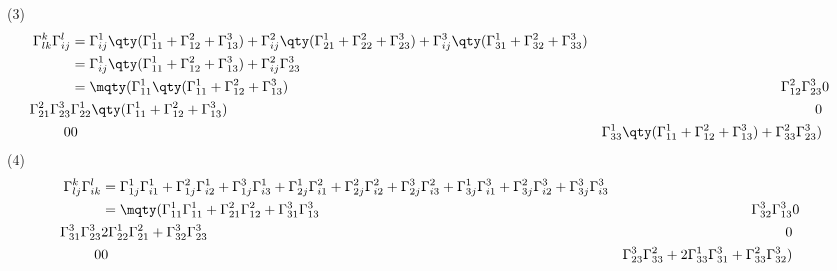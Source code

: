 (3)
\begin{align*}
    \Gamma^k_{lk}\Gamma^l_{ij} &= \Gamma^1_{ij}\qty(\Gamma^1_{11} + \Gamma^2_{12} + \Gamma^3_{13}) + \Gamma^2_{ij}\qty(\Gamma^1_{21} + \Gamma^2_{22} + \Gamma^3_{23}) + \Gamma^3_{ij}\qty(\Gamma^1_{31} + \Gamma^2_{32} + \Gamma^3_{33}) \\
        & = \Gamma^1_{ij}\qty(\Gamma^1_{11} + \Gamma^2_{12} + \Gamma^3_{13}) + \Gamma^2_{ij}\Gamma^3_{23}\\
        & = \mqty(\Gamma^1_{11}\qty(\Gamma^1_{11} + \Gamma^2_{12} + \Gamma^3_{13}) & \Gamma^2_{12}\Gamma^3_{23} & 0 \\ 
                    \Gamma^2_{21}\Gamma^3_{23} & \Gamma^1_{22}\qty(\Gamma^1_{11} + \Gamma^2_{12} + \Gamma^3_{13}) & 0\\
                    0 & 0 & \Gamma^1_{33}\qty(\Gamma^1_{11} + \Gamma^2_{12} + \Gamma^3_{13}) + \Gamma^2_{33}\Gamma^3_{23})
\end{align*}
(4)
\begin{align*}
    \Gamma^k_{lj}\Gamma^l_{ik} &= \Gamma^1_{1j}\Gamma^1_{i1} + \Gamma^2_{1j}\Gamma^1_{i2} + \Gamma^3_{1j}\Gamma^1_{i3} + \Gamma^1_{2j}\Gamma^2_{i1} + \Gamma^2_{2j}\Gamma^2_{i2} + \Gamma^3_{2j}\Gamma^2_{i3} + \Gamma^1_{3j}\Gamma^3_{i1} + \Gamma^2_{3j}\Gamma^3_{i2} + \Gamma^3_{3j}\Gamma^3_{i3} \\
    &=\mqty(\Gamma^1_{11}\Gamma^1_{11} + \Gamma^2_{21}\Gamma^2_{12} + \Gamma^3_{31}\Gamma^3_{13} & \Gamma^3_{32}\Gamma^3_{13} & 0\\
        \Gamma^3_{31}\Gamma^3_{23} & 2\Gamma^1_{22}\Gamma^2_{21} + \Gamma^3_{32}\Gamma^3_{23} & 0\\
        0 & 0 & \Gamma^3_{23}\Gamma^2_{33} + 2\Gamma^1_{33}\Gamma^3_{31} + \Gamma^2_{33}\Gamma^3_{32})
\end{align*}
